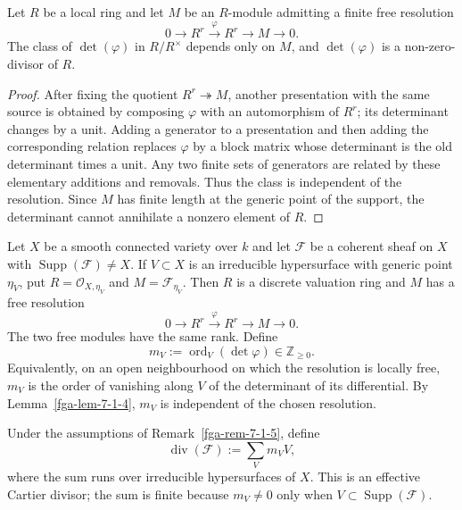 \begin{lemma}\label{fga-lem-7-1-4}\uses{}
Let $R$ be a local ring and let $M$ be an $R$-module admitting a finite free
resolution
\[
0\longrightarrow R^r\xrightarrow{\,\varphi\,}R^r\longrightarrow M\longrightarrow0.
\]
The class of $\det(\varphi)$ in $R/R^{\times}$ depends only on $M$, and
$\det(\varphi)$ is a non-zero-divisor of $R$.
\end{lemma}
\begin{proof}
After fixing the quotient $R^r\twoheadrightarrow M$, another presentation with
the same source is obtained by composing $\varphi$ with an automorphism of
$R^r$; its determinant changes by a unit.  Adding a generator to a presentation
and then adding the corresponding relation replaces $\varphi$ by a block matrix
whose determinant is the old determinant times a unit.  Any two finite sets of
generators are related by these elementary additions and removals.  Thus the
class is independent of the resolution.  Since $M$ has finite length at the
generic point of the support, the determinant cannot annihilate a nonzero
element of $R$.
\end{proof}

\begin{remark}\label{fga-rem-7-1-5}
Let $X$ be a smooth connected variety over $k$ and let $\mathcal F$ be a
coherent sheaf on $X$ with $\operatorname{Supp}(\mathcal F)\ne X$.  If $V\subset X$
is an irreducible hypersurface with generic point $\eta_V$, put
$R=\mathcal O_{X,\eta_V}$ and $M=\mathcal F_{\eta_V}$.  Then $R$ is a discrete
valuation ring and $M$ has a free resolution
\[
0\longrightarrow R^r\xrightarrow{\,\varphi\,}R^r\longrightarrow M\longrightarrow0.
\]
The two free modules have the same rank.  Define
\[
m_V:=\operatorname{ord}_V(\det\varphi)\in\mathbb Z_{\ge 0}.
\]
Equivalently, on an open neighbourhood on which the resolution is locally free,
$m_V$ is the order of vanishing along $V$ of the determinant of its differential.
By Lemma~\ref{fga-lem-7-1-4}, $m_V$ is independent of the chosen resolution.
\end{remark}

\begin{definition}\label{fga-def-7-1-6}
Under the assumptions of Remark~\ref{fga-rem-7-1-5}, define
\[
\operatorname{div}(\mathcal F):=\sum_V m_V V,
\]
where the sum runs over irreducible hypersurfaces of $X$.  This is an effective
Cartier divisor; the sum is finite because $m_V\ne0$ only when
$V\subset\operatorname{Supp}(\mathcal F)$.
\end{definition}

